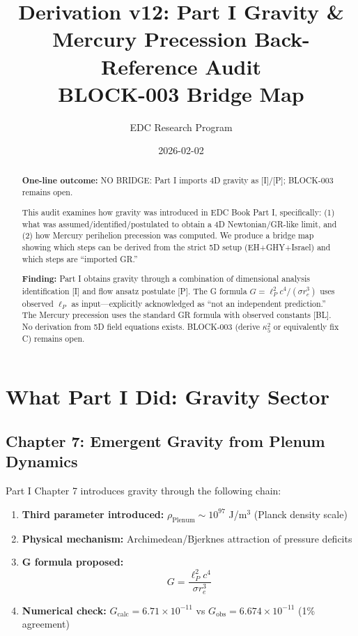 \documentclass[11pt,a4paper]{article}
\title{Derivation v12: Part I Gravity \& Mercury Precession Back-Reference Audit\\
\large BLOCK-003 Bridge Map}
\author{EDC Research Program}
\date{2026-02-02}
\begin{document}
\maketitle

\begin{abstract}
\textbf{One-line outcome:} \textsc{NO BRIDGE}: Part I imports 4D gravity as [I]/[P]; BLOCK-003 remains open.

This audit examines how gravity was introduced in EDC Book Part I, specifically: (1) what was assumed/identified/postulated to obtain a 4D Newtonian/GR-like limit, and (2) how Mercury perihelion precession was computed. We produce a bridge map showing which steps can be derived from the strict 5D setup (EH+GHY+Israel) and which steps are ``imported GR.''

\textbf{Finding:} Part I obtains gravity through a combination of dimensional analysis identification [I] and flow ansatz postulate [P]. The G formula $G = \ell_P^2 c^4/(\sigma r_e^3)$ uses observed $\ell_P$ as input---explicitly acknowledged as ``not an independent prediction.'' The Mercury precession uses the standard GR formula with observed constants [BL]. No derivation from 5D field equations exists. BLOCK-003 (derive $\kappa_5^2$ or equivalently fix C) remains open.
\end{abstract}

\section{What Part I Did: Gravity Sector}
\label{sec:what-part1-did}

\subsection{Chapter 7: Emergent Gravity from Plenum Dynamics}

Part I Chapter 7 introduces gravity through the following chain:

\begin{enumerate}
    \item \textbf{Third parameter introduced:} $\rho_{\text{Plenum}} \sim 10^{97}$ J/m$^3$ (Planck density scale)
    \item \textbf{Physical mechanism:} Archimedean/Bjerknes attraction of pressure deficits
    \item \textbf{G formula proposed:}
    \begin{equation}
    G = \frac{\ell_P^2 c^4}{\sigma r_e^3}
    \label{eq:g-part1}
    \end{equation}
    \item \textbf{Numerical check:} $G_{\text{calc}} = 6.71 \times 10^{-11}$ vs $G_{\text{obs}} = 6.674 \times 10^{-11}$ (1\% agreement)
\end{enumerate}
\end{document}
